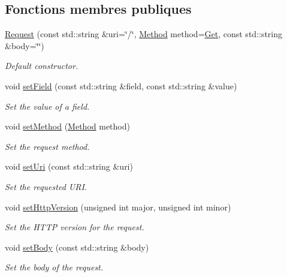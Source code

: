 \subsection*{Fonctions membres publiques}
\begin{DoxyCompactItemize}
\item 
\hyperlink{classsf_1_1Http_1_1Request_a8e89d9e8ffcc1163259b35d79809a61c}{Request} (const std\+::string \&uri=\char`\"{}/\char`\"{}, \hyperlink{classsf_1_1Http_1_1Request_a620f8bff6f43e1378f321bf53fbf5598}{Method} method=\hyperlink{classsf_1_1Http_1_1Request_a620f8bff6f43e1378f321bf53fbf5598ab822baed393f3d0353621e5378b9fcb4}{Get}, const std\+::string \&body=\char`\"{}\char`\"{})
\begin{DoxyCompactList}\small\item\em Default constructor. \end{DoxyCompactList}\item 
void \hyperlink{classsf_1_1Http_1_1Request_aea672fae5dd089f4b6b3745ed46210d2}{set\+Field} (const std\+::string \&field, const std\+::string \&value)
\begin{DoxyCompactList}\small\item\em Set the value of a field. \end{DoxyCompactList}\item 
void \hyperlink{classsf_1_1Http_1_1Request_abab148554e873e80d2e41376fde1cb62}{set\+Method} (\hyperlink{classsf_1_1Http_1_1Request_a620f8bff6f43e1378f321bf53fbf5598}{Method} method)
\begin{DoxyCompactList}\small\item\em Set the request method. \end{DoxyCompactList}\item 
void \hyperlink{classsf_1_1Http_1_1Request_a3723de4b4f1a14b744477841c4ac22e6}{set\+Uri} (const std\+::string \&uri)
\begin{DoxyCompactList}\small\item\em Set the requested U\+RI. \end{DoxyCompactList}\item 
void \hyperlink{classsf_1_1Http_1_1Request_aa683b607b737a6224a91387b4108d3c7}{set\+Http\+Version} (unsigned int major, unsigned int minor)
\begin{DoxyCompactList}\small\item\em Set the H\+T\+TP version for the request. \end{DoxyCompactList}\item 
void \hyperlink{classsf_1_1Http_1_1Request_ae9f61ec3fa1639c70e9b5780cb35578e}{set\+Body} (const std\+::string \&body)
\begin{DoxyCompactList}\small\item\em Set the body of the request. \end{DoxyCompactList}\end{DoxyCompactItemize}
